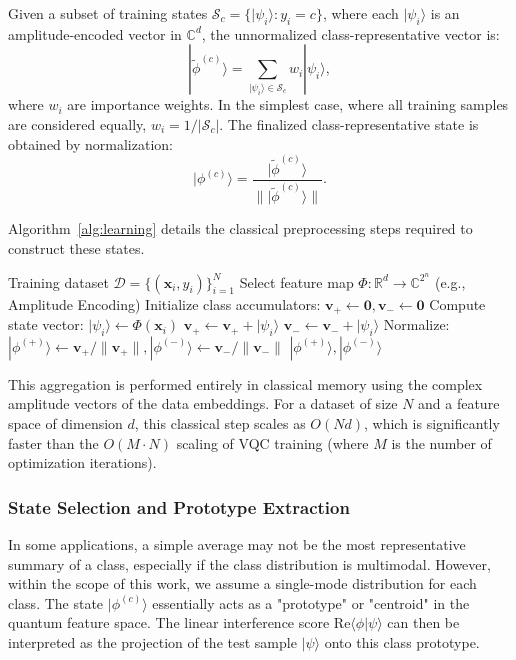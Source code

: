 \documentclass[conference]{IEEEtran}
\begin{document}
Given a subset of training states $\mathcal{S}_c = \{|\psi_i\rangle : y_i = c\}$, where each $|\psi_i\rangle$ is an amplitude-encoded vector in $\mathbb{C}^d$, the unnormalized class-representative vector is:
\begin{equation}
| \tilde{\phi}^{(c)} \rangle = \sum_{|\psi_i\rangle \in \mathcal{S}_c} w_i |\psi_i\rangle,
\end{equation}
where $w_i$ are importance weights. In the simplest case, where all training samples are considered equally, $w_i = 1/|\mathcal{S}_c|$. The finalized class-representative state is obtained by normalization:
\begin{equation}
|\phi^{(c)}\rangle = \frac{| \tilde{\phi}^{(c)} \rangle}{\| | \tilde{\phi}^{(c)} \rangle \|}.
\end{equation}

Algorithm~\ref{alg:learning} details the classical preprocessing steps required to construct these states.

\begin{algorithm}[ht]
\caption{Static Learning of Class-Representative States}
\label{alg:learning}
\begin{algorithmic}[1]
\REQUIRE Training dataset $\mathcal{D} = \{(\mathbf{x}_i, y_i)\}_{i=1}^N$
\STATE Select feature map $\Phi: \mathbb{R}^d \rightarrow \mathbb{C}^{2^n}$ (e.g., Amplitude Encoding)
\STATE Initialize class accumulators: $\mathbf{v}_+ \leftarrow \mathbf{0}, \mathbf{v}_- \leftarrow \mathbf{0}$
    \STATE Compute state vector: $|\psi_i\rangle \leftarrow \Phi(\mathbf{x}_i)$
        \STATE $\mathbf{v}_+ \leftarrow \mathbf{v}_+ + |\psi_i\rangle$
    \ELSE
        \STATE $\mathbf{v}_- \leftarrow \mathbf{v}_- + |\psi_i\rangle$
    \ENDIF
\ENDFOR
\STATE Normalize: $|\phi^{(+)}\rangle \leftarrow \mathbf{v}_+/\|\mathbf{v}_+\|, |\phi^{(-)}\rangle \leftarrow \mathbf{v}_-/\|\mathbf{v}_-\|$
\RETURN $|\phi^{(+)}\rangle, |\phi^{(-)}\rangle$
\end{algorithmic}
\end{algorithm}

This aggregation is performed entirely in classical memory using the complex amplitude vectors of the data embeddings. For a dataset of size $N$ and a feature space of dimension $d$, this classical step scales as $O(Nd)$, which is significantly faster than the $O(M \cdot N)$ scaling of VQC training (where $M$ is the number of optimization iterations).

\subsubsection{State Selection and Prototype Extraction}
In some applications, a simple average may not be the most representative summary of a class, especially if the class distribution is multimodal. However, within the scope of this work, we assume a single-mode distribution for each class. The state $|\phi^{(c)}\rangle$ essentially acts as a "prototype" or "centroid" in the quantum feature space. The linear interference score $\text{Re}\langle \phi | \psi \rangle$ can then be interpreted as the projection of the test sample $|\psi\rangle$ onto this class prototype.
\end{document}
